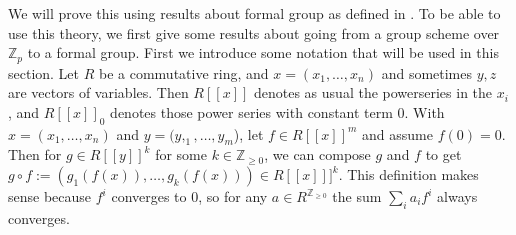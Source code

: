 \documentclass[12pt]{article}
\newcommand{\Z}{\mathbb{Z}}
\theoremstyle{plain}
\theoremstyle{definition}
\theoremstyle{remark}
\begin{document}
We will prove this using results about formal group as defined in \citep{honda70}. To be able to use this theory, we first give some results about going from a group scheme over $\Z_p$ to a formal group.
First we introduce some notation that will be used in this section. Let $R$ be a commutative ring, and $x = (x_1,\dots,x_n)$ and sometimes $y,z$ are vectors of variables. Then $R[[x]]$ denotes as usual the powerseries in the $x_i$, and $R[[x]]_0$ denotes those power series with constant term $0$. With $x = (x_1,\dots,x_n)$ and $y = (y,_1,\dots,y_m$), let $f \in R[[x]]^m$ and assume $f(0) = 0$. Then for $g \in R[[y]]^k$ for some $k\in\Z_{\geq 0}$, we can compose $g$ and $f$ to get $g\circ f := (g_1(f(x)),\dots,g_k(f(x)))\in R[[x]]]^k$. This definition makes sense because $f^i$ converges to $0$, so for any $a \in R^{\Z_{\geq 0}} $ the sum $\sum_i a_i f^i$ always converges. 
\end{document}
